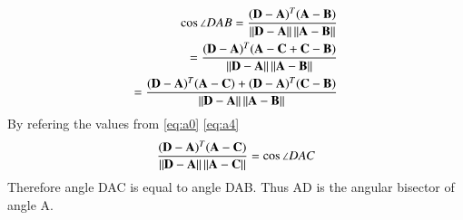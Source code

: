 \documentclass[journal,12pt,twocolumn]{IEEEtran}
\begin{document}
\begin{align}
\cos{\angle DAB} = \frac{(\mathbf{D}-\mathbf{A})^T(\mathbf{A}-\mathbf{B})}{\left\lVert\mathbf{D}-\mathbf{A}\right\rVert\left\lVert\mathbf{A}-\mathbf{B}\right\rVert} \\ =
\frac{(\mathbf{D}-\mathbf{A})^T(\mathbf{A}-\mathbf{C}+\mathbf{C}-\mathbf{B})}{\left\lVert\mathbf{D}-\mathbf{A}\right\rVert\left\lVert\mathbf{A}-\mathbf{B}\right\rVert} \\ =
\frac{(\mathbf{D}-\mathbf{A})^T(\mathbf{A}-\mathbf{C})+(\mathbf{D}-\mathbf{A})^T(\mathbf{C}-\mathbf{B})}{\left\lVert\mathbf{D}-\mathbf{A}\right\rVert\left\lVert\mathbf{A}-\mathbf{B}\right\rVert}
\end{align}
By refering the values from \eqref{eq:a0} \eqref{eq:a4}
\begin{align}
\frac{(\mathbf{D}-\mathbf{A})^T(\mathbf{A}-\mathbf{C})}{\left\lVert\mathbf{D}-\mathbf{A}\right\rVert\left\lVert\mathbf{A}-\mathbf{C}\right\rVert} = \cos{\angle DAC}
\end{align}
Therefore angle DAC is equal to angle DAB. Thus AD is the angular bisector of angle A.
\end{document}
